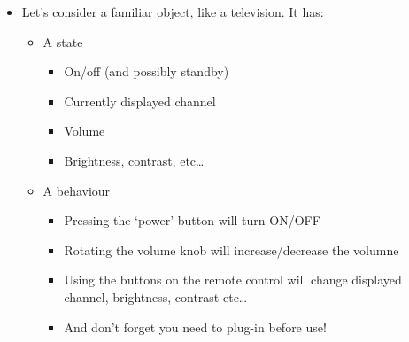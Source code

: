   \begin{itemize}
  \item Let's consider a familiar object, like a television. It has:
    \smallskip
    \begin{itemize}
    \item A state
      \begin{itemize}
      \item On/off (and possibly standby)
      \item Currently displayed channel
      \item Volume
      \item Brightness, contrast, etc\dots
      \end{itemize}

    \medskip
    
    \item A behaviour
      \smallskip
      \begin{itemize}
      \item Pressing the `power' button will turn ON/OFF
      \item Rotating the volume knob will increase/decrease the volumne
      \item Using the buttons on the remote control will change displayed 
            channel, brightness, contrast etc\dots
      \item And don't forget you need to plug-in before use!
      \end{itemize}
    \end{itemize}
  \end{itemize}

